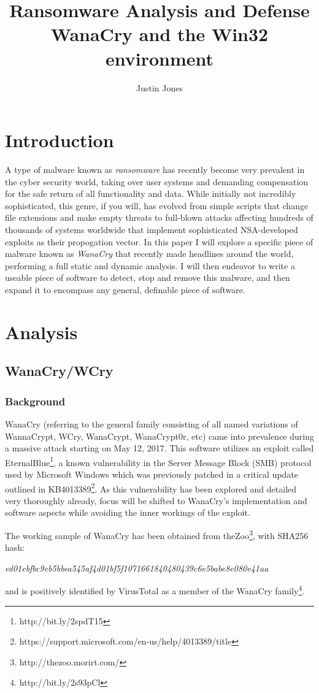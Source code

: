 \documentclass[10pt]{article} %
\title{%
	Ransomware Analysis and Defense \\
	\large WanaCry and the Win32 environment}
\author{Justin Jones}
\begin{document}
\maketitle

\tableofcontents

\section{Introduction}

A type of malware known as \emph{ransomware} has recently become very prevalent in the cyber security world, taking over user systems and demanding compensation for the safe return of all functionality and data.  While initially not incredibly sophisticated, this genre, if you will, has evolved from simple scripts that change file extensions and make empty threats to full-blown attacks affecting hundreds of thousands of systems worldwide that implement sophisticated NSA-developed exploits as their propogation vector. In this paper I will explore a specific piece of malware known as \emph{WanaCry} that recently made headlines around the world, performing a full static and dynamic analysis. I will then endeavor to write a useable piece of software to detect, stop and remove this malware, and then expand it to encompass any general, definable piece of software.

\section{Analysis}

\subsection{WanaCry/WCry}

\subsubsection{Background} 

WanaCry (referring to the general family consisting of all named variations of WannaCrypt, WCry, WanaCrypt, WanaCrypt0r, etc) came into prevalence during a massive attack starting on May 12, 2017. This software utilizes an exploit called EternalBlue\footnote{http://bit.ly/2spdT15}, a known vulnerability in the Server Message Block (SMB) protocol used by Microsoft Windows which was previously patched in a critical update outlined in KB4013389\footnote{https://support.microsoft.com/en-us/help/4013389/title}. As this vulnerability has been explored and detailed very thoroughly already, focus will be shifted to WanaCry's implementation and software aspects while avoiding the inner workings of the exploit. \par
The working sample of WanaCry has been obtained from theZoo\footnote{http://thezoo.morirt.com/}, with SHA256 hash: 
\begin{quoting} 
\centering
\emph{ed01ebfbc9eb5bbea545af4d01bf5f1071661840480439c6e5babe8e080e41aa}

\end{quoting}
and is positively identified by VirusTotal as a member of the WanaCry family\footnote{http://bit.ly/2s93pCl}.
\end{document}
